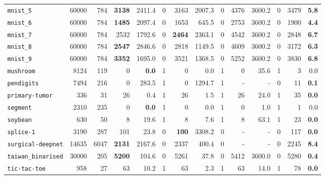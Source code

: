 \begin{tabular}{lccrrrrrrrrrrr}
\texttt{mnist\_5} & \multicolumn{1}{r}{60000} & \multicolumn{1}{r}{784}  & \textbf{3138} & 2411.4 & 0 & 3163 & 2007.3 & 0 & 4376 & 3600.2 & 0 & 3479 & \textbf{5.8}\\
\texttt{mnist\_6} & \multicolumn{1}{r}{60000} & \multicolumn{1}{r}{784}  & \textbf{1485} & 2097.4 & 0 & 1653 & 645.5 & 0 & 2753 & 3600.2 & 0 & 1900 & \textbf{4.4}\\
\texttt{mnist\_7} & \multicolumn{1}{r}{60000} & \multicolumn{1}{r}{784}  & 2532 & 1792.6 & 0 & \textbf{2464} & 2363.1 & 0 & 4542 & 3600.2 & 0 & 2848 & \textbf{6.7}\\
\texttt{mnist\_8} & \multicolumn{1}{r}{60000} & \multicolumn{1}{r}{784}  & \textbf{2547} & 2846.6 & 0 & 2818 & 1149.5 & 0 & 4609 & 3600.2 & 0 & 3172 & \textbf{6.3}\\
\texttt{mnist\_9} & \multicolumn{1}{r}{60000} & \multicolumn{1}{r}{784}  & \textbf{3352} & 1695.0 & 0 & 3521 & 1368.5 & 0 & 5252 & 3600.2 & 0 & 3830 & \textbf{6.8}\\
\texttt{mushroom} & \multicolumn{1}{r}{8124} & \multicolumn{1}{r}{119}  & 0 & \textbf{0.0} & 1 & 0 & 0.0 & 1 & 0 & 35.6 & 1 & 3 & 0.0\\
\texttt{pendigits} & \multicolumn{1}{r}{7494} & \multicolumn{1}{r}{216}  & 0 & 283.5 & 1 & 0 & 1294.7 & 1 & - & - & 0 & 11 & \textbf{0.1}\\
\texttt{primary-tumor} & \multicolumn{1}{r}{336} & \multicolumn{1}{r}{31}  & 26 & 0.4 & 1 & 26 & 1.5 & 1 & 26 & 24.0 & 1 & 35 & \textbf{0.0}\\
\texttt{segment} & \multicolumn{1}{r}{2310} & \multicolumn{1}{r}{235}  & 0 & \textbf{0.0} & 1 & 0 & 0.0 & 1 & 0 & 1.0 & 1 & 1 & 0.0\\
\texttt{soybean} & \multicolumn{1}{r}{630} & \multicolumn{1}{r}{50}  & 8 & 19.6 & 1 & 8 & 7.6 & 1 & 8 & 63.1 & 1 & 23 & \textbf{0.0}\\
\texttt{splice-1} & \multicolumn{1}{r}{3190} & \multicolumn{1}{r}{287}  & 101 & 23.8 & 0 & \textbf{100} & 3308.2 & 0 & - & - & 0 & 117 & \textbf{0.0}\\
\texttt{surgical-deepnet} & \multicolumn{1}{r}{14635} & \multicolumn{1}{r}{6047}  & \textbf{2131} & 2167.6 & 0 & 2337 & 400.4 & 0 & - & - & 0 & 2245 & \textbf{8.4}\\
\texttt{taiwan\_binarised} & \multicolumn{1}{r}{30000} & \multicolumn{1}{r}{205}  & \textbf{5200} & 104.6 & 0 & 5261 & 37.8 & 0 & 5412 & 3600.0 & 0 & 5280 & \textbf{0.4}\\
\texttt{tic-tac-toe} & \multicolumn{1}{r}{958} & \multicolumn{1}{r}{27}  & 63 & 10.2 & 1 & 63 & 2.3 & 1 & 63 & 14.0 & 1 & 78 & \textbf{0.0}\\

\end{tabular}
